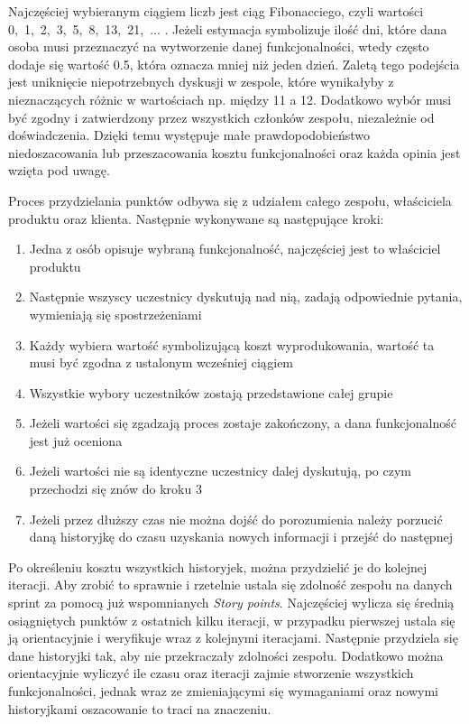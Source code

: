 Najczęściej wybieranym ciągiem liczb jest ciąg Fibonacciego, czyli wartości \mbox{0, 1, 2, 3, 5, 8, 13, 21, ...} . Jeżeli estymacja symbolizuje ilość dni, które dana osoba musi przeznaczyć na wytworzenie danej funkcjonalności, wtedy często dodaje się wartość 0.5, która oznacza mniej niż jeden dzień. Zaletą tego podejścia jest uniknięcie niepotrzebnych dyskusji w zespole, które wynikałyby z nieznaczących różnic w wartościach np. między 11 a 12. Dodatkowo wybór musi być zgodny i zatwierdzony przez wszystkich członków zespołu, niezależnie od doświadczenia. Dzięki temu występuje małe prawdopodobieństwo niedoszacowania lub przeszacowania kosztu funkcjonalności oraz każda opinia jest wzięta pod uwagę.

Proces przydzielania punktów odbywa się z udziałem całego zespołu, właściciela produktu oraz klienta. Następnie wykonywane są następujące kroki:
\begin{enumerate}
	\item Jedna z osób opisuje wybraną funkcjonalność, najczęściej jest to właściciel produktu
	\item Następnie wszyscy uczestnicy dyskutują nad nią, zadają odpowiednie pytania, wymieniają się spostrzeżeniami
	\item Każdy wybiera wartość symbolizującą koszt wyprodukowania, wartość ta musi być zgodna z ustalonym wcześniej ciągiem
	\item Wszystkie wybory uczestników zostają przedstawione całej grupie
	\item Jeżeli wartości się zgadzają proces zostaje zakończony, a dana funkcjonalność jest już oceniona
	\item Jeżeli wartości nie są identyczne uczestnicy dalej dyskutują, po czym przechodzi się znów do kroku 3
	\item Jeżeli przez dłuższy czas nie można dojść do porozumienia należy porzucić daną historyjkę do czasu uzyskania nowych informacji i przejść do następnej
\end{enumerate}  

Po określeniu kosztu wszystkich historyjek, można przydzielić je do kolejnej iteracji. Aby zrobić to sprawnie i rzetelnie ustala się zdolność zespołu na danych sprint za pomocą już wspomnianych \textit{Story points}. Najczęściej wylicza się średnią osiągniętych punktów z ostatnich kilku iteracji, w przypadku pierwszej ustala się ją orientacyjnie i weryfikuje wraz z kolejnymi iteracjami. Następnie przydziela się dane historyjki tak, aby nie przekraczały zdolności zespołu. Dodatkowo można orientacyjnie wyliczyć ile czasu oraz iteracji zajmie stworzenie wszystkich funkcjonalności, jednak wraz ze zmieniającymi się wymaganiami oraz nowymi historyjkami oszacowanie to traci na znaczeniu. 



